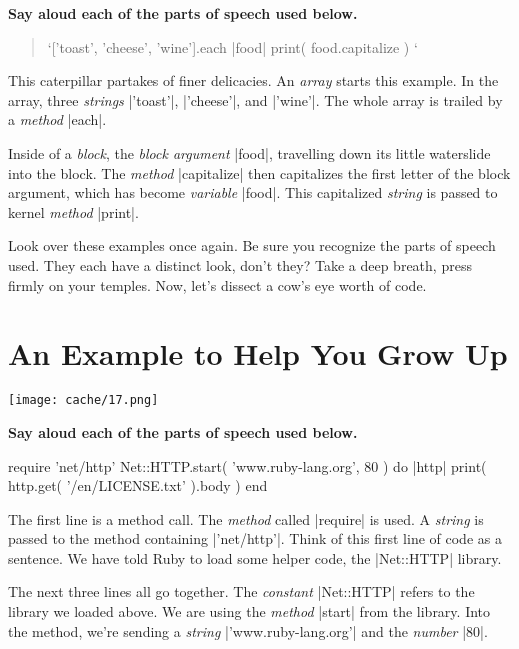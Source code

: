 \documentclass[12pt,twoside]{report}
\begin{document}
{\bf Say aloud each of the parts of speech used below.}

\begin{quote}
\rubyinline`['toast', 'cheese', 'wine'].each { |food| print( food.capitalize ) }`\end{quote}

This caterpillar partakes of finer delicacies.  An {\em array} starts
this example.  In the array, three {\em strings}
\rubyinline|'toast'|,
\rubyinline|'cheese'|, and
\rubyinline|'wine'|.  The whole array is trailed by a
          {\em method} \rubyinline|each|.

Inside of a {\em block}, the {\em block argument}
\rubyinline|food|, travelling down its little
waterslide into the block.  The {\em method}
\rubyinline|capitalize| then capitalizes the first
letter of the block argument, which has become {\em variable}
\rubyinline|food|.  This capitalized {\em string} is
passed to kernel {\em method} \rubyinline|print|.

Look over these examples once again.  Be sure you recognize the parts
of speech used.  They each have a distinct look, don't they?  Take a
deep breath, press firmly on your temples.  Now, let's dissect a cow's
eye worth of code.


\section{An Example to Help You Grow Up}


	\texttt{[image: cache/17.png]}

{\bf Say aloud each of the parts of speech used below.}


\begin{rubycode}

 require 'net/http' 
 Net::HTTP.start( 'www.ruby-lang.org', 80 ) do |http| 
   print( http.get( '/en/LICENSE.txt' ).body ) 
 end

\end{rubycode}


The first line is a method call.  The {\em method} called
\rubyinline|require| is used.  A {\em string} is
passed to the method containing
\rubyinline|'net/http'|.  Think of this first line of
code as a sentence.  We have told Ruby to load some helper code, the
\rubyinline|Net::HTTP| library.

The next three lines all go together.  The {\em constant}
\rubyinline|Net::HTTP| refers to the library we loaded
above. We are using the {\em method}
\rubyinline|start| from the library.  Into the method,
we're sending a {\em string}
\rubyinline|'www.ruby-lang.org'| and the {\em number}
\rubyinline|80|.
\end{document}
